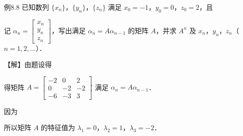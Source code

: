 \begin{fcard}{例8.8}
已知数列 $\{x_n\}$，$\{y_n\}$，$\{z_n\}$ 满足 $x_0=-1$，$y_0=0$，$z_0=2$，且


记 $\alpha_n=\begin{bmatrix}x_n\\y_n\\z_n\end{bmatrix}$，写出满足 $\alpha_n=A\alpha_{n-1}$ 的矩阵 $A$，并求 $A^n$ 及 $x_n$，$y_n$，$z_n$（$n=1,2,\dots$）．


【解】由题设得


得矩阵 $A=\begin{bmatrix}-2&0&2\\0&-2&-2\\-6&-3&3\end{bmatrix}$ 满足 $\alpha_n=A\alpha_{n-1}$．

因为


所以矩阵 $A$ 的特征值为 $\lambda_1=0$，$\lambda_2=1$，$\lambda_3=-2$．


\end{fcard}
